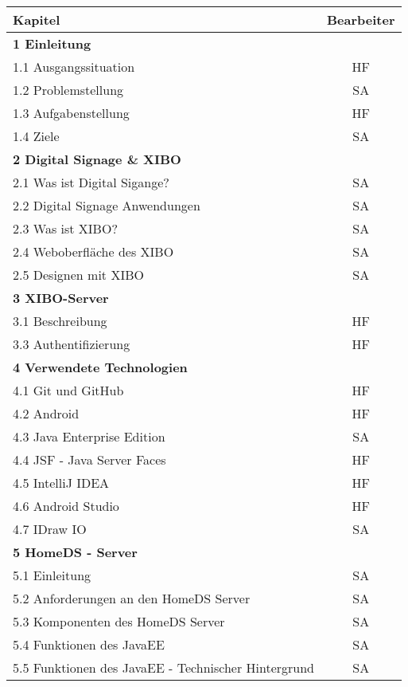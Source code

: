 \vspace{0.5cm}
\begin{longtable}{| l | l | c |}
\multicolumn{2}{l}{\textbf{Kapitel}} & \multicolumn{1}{c}{\textbf{Bearbeiter}} \\ \hline
\multicolumn{3}{|l|}{\textbf{1 Einleitung}} \\
\multicolumn{2}{|l|}{1.1 Ausgangssituation} & HF \\
\multicolumn{2}{|l|}{1.2 Problemstellung} & SA \\
\multicolumn{2}{|l|}{1.3 Aufgabenstellung} & HF \\
\multicolumn{2}{|l|}{1.4 Ziele} & SA \\ \hline

\multicolumn{3}{|l|}{\textbf{2 Digital Signage \& XIBO}} \\ \hline
\multicolumn{2}{|l|}{2.1 Was ist Digital Sigange?} & SA \\
\multicolumn{2}{|l|}{2.2 Digital Signage Anwendungen} & SA \\
\multicolumn{2}{|l|}{2.3 Was ist XIBO?} & SA \\
\multicolumn{2}{|l|}{2.4 Weboberfläche des XIBO} & SA \\
\multicolumn{2}{|l|}{2.5 Designen mit XIBO} & SA \\ \hline

\multicolumn{3}{|l|}{\textbf{3 XIBO-Server}} \\ \hline
\multicolumn{2}{|l|}{3.1 Beschreibung} & HF
\multicolumn{2}{|l|}{3.3 API} & HF \\ \hline
\multicolumn{2}{|l|}{3.3 Authentifizierung} & HF \\ \hline

\multicolumn{3}{|l|}{\textbf{4 Verwendete Technologien}} \\ \hline
\multicolumn{2}{|l|}{4.1 Git und GitHub} & HF \\
\multicolumn{2}{|l|}{4.2 Android} & HF \\
\multicolumn{2}{|l|}{4.3 Java Enterprise Edition} & SA \\
\multicolumn{2}{|l|}{4.4 JSF - Java Server Faces} & HF \\
\multicolumn{2}{|l|}{4.5 IntelliJ IDEA} & HF \\
\multicolumn{2}{|l|}{4.6 Android Studio} & HF \\
\multicolumn{2}{|l|}{4.7 IDraw IO} & SA \\ \hline

\multicolumn{3}{|l|}{\textbf{5 HomeDS - Server}} \\ \hline
\multicolumn{2}{|l|}{5.1 Einleitung} & SA \\
\multicolumn{2}{|l|}{5.2 Anforderungen an den HomeDS Server} & SA \\
\multicolumn{2}{|l|}{5.3 Komponenten des HomeDS Server} & SA \\
\multicolumn{2}{|l|}{5.4 Funktionen des JavaEE} & SA \\
\multicolumn{2}{|l|}{5.5 Funktionen des JavaEE - Technischer Hintergrund} & SA \\ \hline


\end{longtable}
